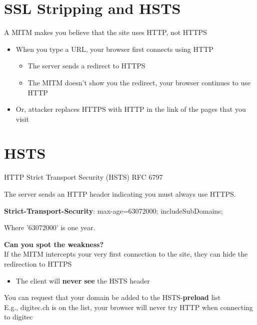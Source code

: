 \documentclass[11pt]{article}
\begin{document}
\section*{SSL Stripping and HSTS}

A MITM makes you believe that the site uses HTTP, not HTTPS

\begin{itemize}
	\item When you type a URL, your browser first connects using HTTP
	\begin{itemize}
		\item The server sends a redirect to HTTPS
		\item The MITM doesn't show you the redirect, your browser continues to use HTTP
	\end{itemize}
	\item Or, attacker replaces HTTPS with HTTP in the link of the pages that you visit
\end{itemize}

\section*{HSTS}
HTTP Strict Transport Security (HSTS) RFC 6797

The server sends an HTTP header indicating you must always use HTTPS.

\textbf{Strict-Transport-Security}: max-age=63072000; includeSubDomains;

Where '63072000' is one year.


\begin{tcolorbox}[
  colback=yellow!15,     %
  colframe=black!50,    %
  boxrule=1pt,       %
  arc=3mm,             %
  left=4mm, right=4mm, top=2mm, bottom=2mm %
]
\textbf{Can you spot the weakness?} \\

If the MITM intercepts your very first connection to the site, they can hide the redirection to HTTPS

\begin{itemize}
	\item The client will \textbf{never see} the HSTS header
\end{itemize}

You can request that your domain be added to the HSTS-\textbf{preload} list \\

E.g., digitec.ch is on the list, your browser will never try HTTP when connecting to digitec
\end{tcolorbox}
\end{document}
